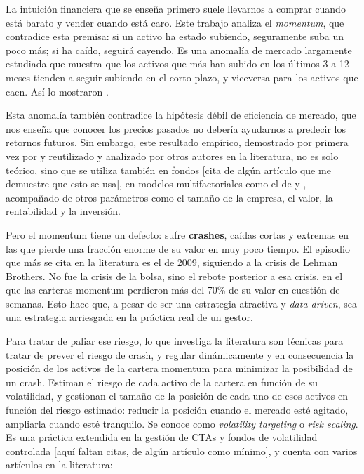 \documentclass[12pt]{report} %
\begin{document}
La intuición financiera que se enseña primero suele llevarnos a comprar cuando está barato y vender cuando está caro. Este trabajo analiza el \textit{momentum}, que contradice esta premisa: si un activo ha estado subiendo, seguramente suba un poco más; si ha caído, seguirá cayendo. Es una anomalía de mercado largamente estudiada que muestra que los activos que más han subido en los últimos 3 a 12 meses tienden a seguir subiendo en el corto plazo, y viceversa para los activos que caen. Así lo mostraron \citet{jegadeeshtitman1993}.

Esta anomalía también contradice la hipótesis débil de eficiencia de mercado, que nos enseña que conocer los precios pasados no debería ayudarnos a predecir los retornos futuros. Sin embargo, este resultado empírico, demostrado por primera vez por \citet{jegadeeshtitman1993} y reutilizado y analizado por otros autores en la literatura, no es solo teórico, sino que se utiliza también en fondos [cita de algún artículo que me demuestre que esto se usa], en modelos multifactoriales como el de \citet{carhart1997} y \citet{famafrench2015}, acompañado de otros parámetros como el tamaño de la empresa, el valor, la rentabilidad y la inversión.

Pero el momentum tiene un defecto: sufre \textbf{crashes}, caídas cortas y extremas en las que pierde una fracción enorme de su valor en muy poco tiempo. El episodio que más se cita en la literatura es el de 2009, siguiendo a la crisis de Lehman Brothers. No fue la crisis de la bolsa, sino el rebote posterior a esa crisis, en el que las carteras momentum perdieron más del 70\% de su valor en cuestión de semanas. Esto hace que, a pesar de ser una estrategia atractiva y \textit{data-driven}, sea una estrategia arriesgada en la práctica real de un gestor.

Para tratar de paliar ese riesgo, lo que investiga la literatura son técnicas para tratar de prever el riesgo de crash, y regular dinámicamente y en consecuencia la posición de los activos de la cartera momentum para minimizar la posibilidad de un crash. Estiman el riesgo de cada activo de la cartera en función de su volatilidad, y gestionan el tamaño de la posición de cada uno de esos activos en función del riesgo estimado: reducir la posición cuando el mercado esté agitado, ampliarla cuando esté tranquilo. Se conoce como \textit{volatility targeting} o \textit{risk scaling}. Es una práctica extendida en la gestión de CTAs y fondos de volatilidad controlada [aquí faltan citas, de algún artículo como mínimo], y cuenta con varios artículos en la literatura:
\end{document}
